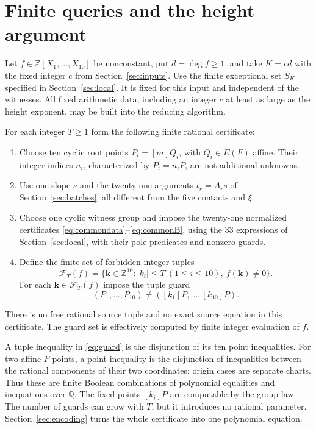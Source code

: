 \documentclass[11pt,reqno]{amsart}
\theoremstyle{definition}
\numberwithin{equation}{section}
\newcommand{\Q}{\mathbb Q}
\newcommand{\Z}{\mathbb Z}
\begin{document}
\section{Finite queries and the height argument}\label{sec:reduction}

Let $f\in\Z[X_1,\ldots,X_{10}]$ be nonconstant, put $d=\deg f\ge1$, and take $K=cd$ with the fixed integer $c$ from Section~\ref{sec:inputs}. Use the finite exceptional set $S_K$ specified in Section~\ref{sec:local}. It is fixed for this input and independent of the witnesses. 
All fixed arithmetic data, including an integer $c$ at least as large as the height exponent, may be built into the reducing algorithm. 

For each integer $T\ge1$ form the following finite rational certificate:
\begin{enumerate}
\item Choose ten cyclic root points $P_i=[m]Q_i$, with $Q_i\in E(F)$ affine. Their integer indices $n_i$, characterized by $P_i=n_iP$, are not additional unknowns.
\item Use one slope $s$ and the twenty-one arguments $t_r=A_rs$ of Section~\ref{sec:batches}, all different from the five contacts and $\xi$.
\item Choose one cyclic witness group and impose the twenty-one normalized certificates \eqref{eq:commondata}--\eqref{eq:commonB}, using the 33 expressions of Section~\ref{sec:local}, with their pole predicates and nonzero guards.
\item Define the finite set of forbidden integer tuples
\begin{equation}\label{eq:forbiddenset}
 \mathcal F_T(f)=\{\mathbf k\in\Z^{10}:|k_i|\le T\ (1\le i\le10),\ f(\mathbf k)\ne0\}.
\end{equation}
For each $\mathbf k\in\mathcal F_T(f)$ impose the tuple guard
\begin{equation}\label{eq:guard}
 (P_1,\ldots,P_{10})\ne([k_1]P,\ldots,[k_{10}]P).
\end{equation}
\end{enumerate}
There is no free rational source tuple and no exact source equation in this certificate. The guard set is effectively computed by finite integer evaluation of $f$.

A tuple inequality in \eqref{eq:guard} is the disjunction of its ten point inequalities. For two affine $F$-points, a point inequality is the disjunction of inequalities between the rational components of their two coordinates; origin cases are separate charts. Thus these are finite Boolean combinations of polynomial equalities and inequations over $\Q$. The fixed points $[k_i]P$ are computable by the group law. The number of guards can grow with $T$, but it introduces no rational parameter. Section~\ref{sec:encoding} turns the whole certificate into one polynomial equation.
\end{document}
